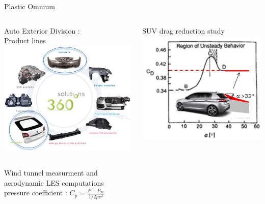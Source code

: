\documentclass{beamer}
\begin{document}
\begin{frame}{Plastic Omnium}
  \begin{columns}[onlytextwidth,t]
    \begin{column}{0.6\textwidth}
      Auto Exterior Division :\\
      Product lines
      \includegraphics[scale=0.65]{image1-1}
    \end{column}
    \begin{column}{0.4\textwidth}
      SUV drag reduction study
      \includegraphics[scale=0.65]{image1-2}
    \end{column}
  \end{columns}
  \begin{columns}[onlytextwidth]
    \begin{column}{0.5\textwidth}
      Wind tunnel measurment and\\
      aerodynamic LES computations\\
      pressure coefficient : $C_p=\frac{P-P_\infty}{1/2pv^2}$

\end{column}
\end{columns}
\end{frame}
\end{document}
